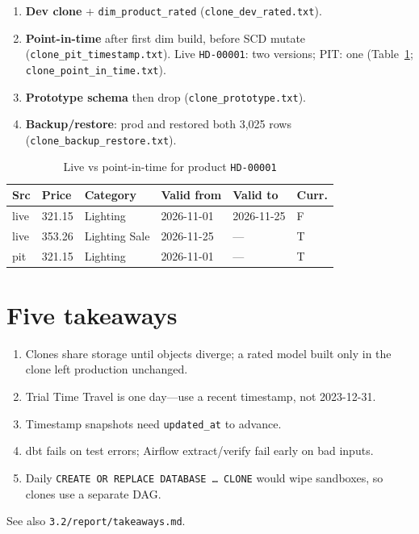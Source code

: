 \documentclass[conference]{IEEEtran}
\begin{document}
\begin{enumerate}[leftmargin=*,itemsep=2pt]
  \item \textbf{Dev clone} + \texttt{dim\_product\_rated}
        (\texttt{clone\_dev\_rated.txt}).
  \item \textbf{Point-in-time} after first dim build, before SCD mutate
        (\texttt{clone\_pit\_timestamp.txt}).
        Live \texttt{HD-00001}: two versions; PIT: one
        (Table~\ref{tab:pit}; \texttt{clone\_point\_in\_time.txt}).
  \item \textbf{Prototype schema} then drop
        (\texttt{clone\_prototype.txt}).
  \item \textbf{Backup/restore}: prod and restored both 3{,}025 rows
        (\texttt{clone\_backup\_restore.txt}).
\end{enumerate}

\begin{table}[htbp]
\caption{Live vs point-in-time for product \texttt{HD-00001}}
\label{tab:pit}
\centering
\footnotesize
\begin{tabular}{@{}llllll@{}}
\toprule
Src & Price & Category & Valid from & Valid to & Curr. \\
\midrule
live & 321.15 & Lighting & 2026-11-01 & 2026-11-25 & F \\
live & 353.26 & Lighting Sale & 2026-11-25 & --- & T \\
pit & 321.15 & Lighting & 2026-11-01 & --- & T \\
\bottomrule
\end{tabular}
\end{table}

\section{Five takeaways}
\begin{enumerate}[leftmargin=*,itemsep=2pt]
  \item Clones share storage until objects diverge; a rated model built
        only in the clone left production unchanged.
  \item Trial Time Travel is one day---use a recent timestamp, not
        2023-12-31.
  \item Timestamp snapshots need \texttt{updated\_at} to advance.
  \item dbt fails on test errors; Airflow extract/verify fail early on
        bad inputs.
  \item Daily \texttt{CREATE OR REPLACE DATABASE \ldots\ CLONE} would wipe
        sandboxes, so clones use a separate DAG.
\end{enumerate}
See also \texttt{3.2/report/takeaways.md}.
\end{document}
